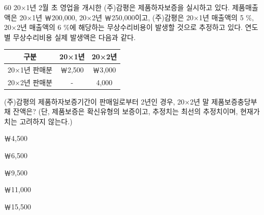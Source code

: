 \begin{question}{60}
20×1년 2월 초 영업을 개시한 (주)감평은 제품하자보증을 실시하고 있다. 제품매출액은 20×1년 ￦200,000, 20×2년 ￦250,000이고, (주)감평은 20×1년 매출액의 5 \%, 20×2년 매출액의 6 \%에 해당하는 무상수리비용이 발생할 것으로 추정하고 있다. 연도별 무상수리비용 실제 발생액은 다음과 같다.
\par{\small\centering
\begin{tabular}{|c|c|c|}\hline
구분 & 20×1년 & 20×2년 \\ \hline
20×1년 판매분 & ￦2,500 & ￦3,000 \\ \hline
20×2년 판매분 & - & 4,000 \\ \hline
\end{tabular}
\par}
(주)감평의 제품하자보증기간이 판매일로부터 2년인 경우, 20×2년 말 제품보증충당부채 잔액은? (단, 제품보증은 확신유형의 보증이고, 추정치는 최선의 추정치이며, 현재가치는 고려하지 않는다.)
\begin{choices}
  \item ￦4,500
  \item ￦6,500
  \item ￦9,500
  \item ￦11,000
  \item ￦15,500
\end{choices}
\end{question}
